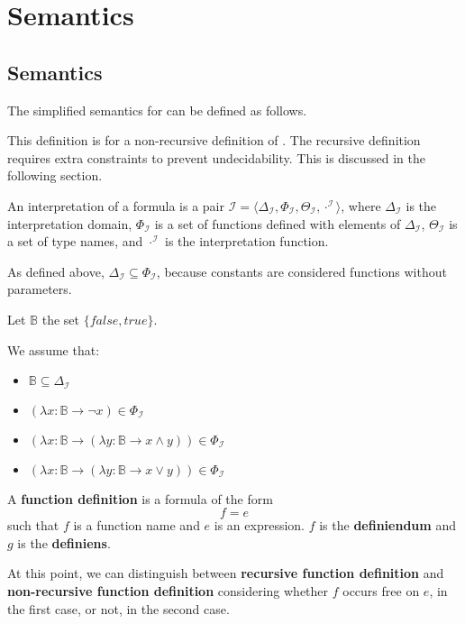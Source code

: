\chapter{Semantics}

\section{Semantics}

\newcommand{\I}[1]{\ensuremath{{#1}^{\mathcal{I}}}}

\newcommand{\DeltaI}{\ensuremath{\Delta _{\mathcal{I}}}}
\newcommand{\ThetaI}{\ensuremath{\Theta _{\mathcal{I}}}}
\newcommand{\PhiI}{\ensuremath{\Phi _{\mathcal{I}}}}

\newcommand{\lambd}[2]{\ensuremath{(\lambda {#1} \to {#2})}}

The simplified semantics for \Soda can be defined as follows.

This definition is for a non-recursive definition of \Soda.
The recursive definition requires extra constraints to prevent undecidability.
This is discussed in the following section.

An interpretation of a \Soda formula is a pair $\mathcal{I} = \langle \DeltaI, \PhiI, \ThetaI, \I{\cdot} \rangle$, where $\DeltaI$ is the interpretation domain, $\PhiI$ is a set of functions defined with elements of $\DeltaI$, $\ThetaI$ is a set of type names, and $\I{\cdot}$ is the interpretation function.

As defined above, $\DeltaI \subseteq \PhiI$, because constants are considered functions without parameters.

Let $\mathbb{B}$ the set $\{false, true\}$.

We assume that:
\begin{itemize}
    \item $\mathbb{B} \subseteq \DeltaI$
    \item $\lambd{x: \mathbb{B}}{\lnot x} \in \PhiI$
    \item $\lambd{x: \mathbb{B}}{\lambd{y: \mathbb{B}}{x \land y}} \in \PhiI$
    \item $\lambd{x: \mathbb{B}}{\lambd{y: \mathbb{B}}{x \lor y}} \in \PhiI$
\end{itemize}

A \textbf{function definition} is a formula of the form
\[f = e\]
such that $f$ is a function name and $e$ is an expression.
$f$ is the \textbf{definiendum} and $g$ is the \textbf{definiens}.


At this point, we can distinguish between \textbf{recursive function definition} and \textbf{non-recursive function definition} considering whether $f$ occurs free on $e$, in the first case, or not, in the second case.

